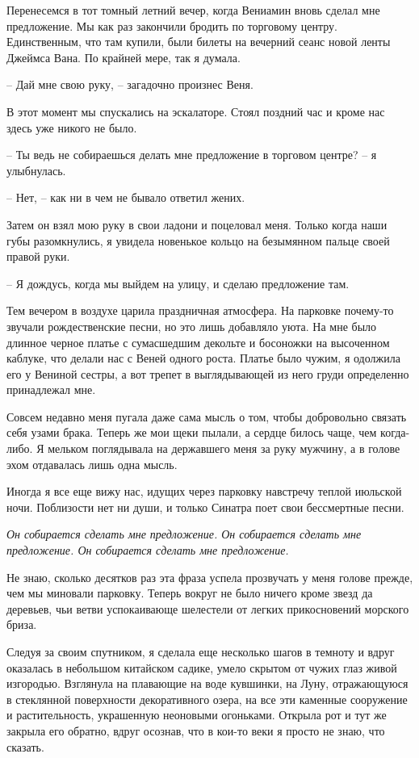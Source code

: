 \documentclass[
]{book}
\begin{document}
Перенесемся в тот томный летний вечер, когда Вениамин вновь сделал мне предложение. Мы как раз закончили бродить по торговому центру. Единственным, что там купили, были билеты на вечерний сеанс новой ленты Джеймса Вана. По крайней мере, так я думала.

-- Дай мне свою руку, -- загадочно произнес Веня.

В этот момент мы спускались на эскалаторе. Стоял поздний час и кроме нас здесь уже никого не было.

-- Ты ведь не собираешься делать мне предложение в торговом центре? -- я улыбнулась.

-- Нет, -- как ни в чем не бывало ответил жених.

Затем он взял мою руку в свои ладони и поцеловал меня. Только когда наши губы разомкнулись, я увидела новенькое кольцо на безымянном пальце своей правой руки.

-- Я дождусь, когда мы выйдем на улицу, и сделаю предложение там.

Тем вечером в воздухе царила праздничная атмосфера. На парковке почему-то звучали рождественские песни, но это лишь добавляло уюта. На мне было длинное черное платье с сумасшедшим декольте и босоножки на высоченном каблуке, что делали нас с Веней одного роста. Платье было чужим, я одолжила его у Вениной сестры, а вот трепет в выглядывающей из него груди определенно принадлежал мне.

Совсем недавно меня пугала даже сама мысль о том, чтобы добровольно связать себя узами брака. Теперь же мои щеки пылали, а сердце билось чаще, чем когда-либо. Я мельком поглядывала на державшего меня за руку мужчину, а в голове эхом отдавалась лишь одна мысль.

Иногда я все еще вижу нас, идущих через парковку навстречу теплой июльской ночи. Поблизости нет ни души, и только Синатра поет свои бессмертные песни.

\emph{Он собирается сделать мне предложение. Он собирается сделать мне предложение. Он собирается сделать мне предложение.}

Не знаю, сколько десятков раз эта фраза успела прозвучать у меня голове прежде, чем мы миновали парковку. Теперь вокруг не было ничего кроме звезд да деревьев, чьи ветви успокаивающе шелестели от легких прикосновений морского бриза.

Следуя за своим спутником, я сделала еще несколько шагов в темноту и вдруг оказалась в небольшом китайском садике, умело скрытом от чужих глаз живой изгородью. Взглянула на плавающие на воде кувшинки, на Луну, отражающуюся в стеклянной поверхности декоративного озера, на все эти каменные сооружение и растительность, украшенную неоновыми огоньками. Открыла рот и тут же закрыла его обратно, вдруг осознав, что в кои-то веки я просто не знаю, что сказать.
\end{document}

